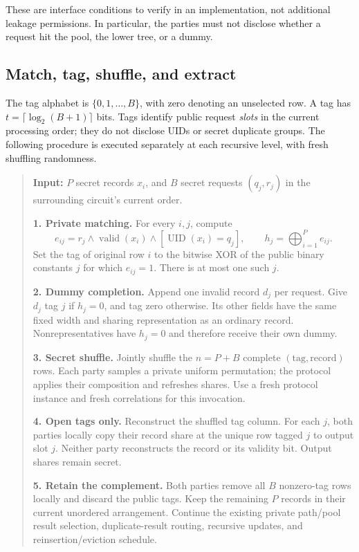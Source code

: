 These are interface conditions to verify in an implementation, not additional
leakage permissions.  In particular, the parties must not disclose whether
a request hit the pool, the lower tree, or a dummy.

\subsection{Match, tag, shuffle, and extract}

The tag alphabet is $\{0,1,\ldots,B\}$, with zero denoting an unselected row.
A tag has $t=\lceil\log_2(B+1)\rceil$ bits.  Tags identify public request
\emph{slots} in the current processing order; they do not disclose UIDs or
secret duplicate groups.  The following procedure is executed separately
at each recursive level, with fresh shuffling randomness.

\begin{quote}\small
\textbf{Input:} $P$ secret records $x_i$, and $B$ secret requests
$(q_j,r_j)$ in the surrounding circuit's current order.

\textbf{1. Private matching.} For every $i,j$, compute
\[
 e_{ij}=r_j\wedge\operatorname{valid}(x_i)
              \wedge[\operatorname{UID}(x_i)=q_j],\qquad
 h_j=\bigoplus_{i=1}^{P}e_{ij}.
\]
Set the tag of original row $i$ to the bitwise XOR of the public binary
constants $j$ for which $e_{ij}=1$.  There is at most one such $j$.

\textbf{2. Dummy completion.} Append one invalid record $d_j$ per request.
Give $d_j$ tag $j$ if $h_j=0$, and tag zero otherwise.  Its other fields
have the same fixed width and sharing representation as an ordinary record.
Nonrepresentatives have $h_j=0$ and therefore receive their own dummy.

\textbf{3. Secret shuffle.} Jointly shuffle the $n=P+B$ complete
$(\mathrm{tag},\mathrm{record})$ rows.  Each party samples a private uniform
permutation; the protocol applies their composition and refreshes shares.
Use a fresh protocol instance and fresh correlations for this invocation.

\textbf{4. Open tags only.} Reconstruct the shuffled tag column.  For each
$j$, both parties locally copy their record share at the unique row tagged
$j$ to output slot $j$.  Neither party reconstructs the record or its
validity bit.  Output shares remain secret.

\textbf{5. Retain the complement.} Both parties remove all $B$ nonzero-tag
rows locally and discard the public tags.  Keep the remaining $P$ records
in their current unordered arrangement.  Continue the existing private
path/pool result selection, duplicate-result routing, recursive updates,
and reinsertion/eviction schedule.
\end{quote}

